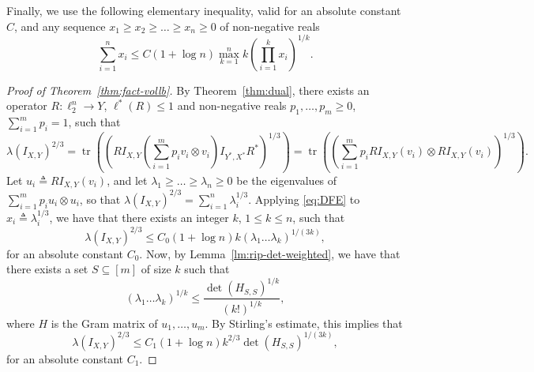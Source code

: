 \documentclass[12pt]{article}
\newcommand{\eqdef}{\triangleq}
\DeclareMathOperator{\tr}{tr}
\begin{document}
Finally, we use the following elementary inequality, valid for an
absolute constant $C$, and any sequence $x_1 \ge x_2 \ge \ldots \ge
x_n \ge 0$ of non-negative reals
\begin{equation}
  \label{eq:DFE} %
  \sum_{i = 1}^n{x_i} \le C(1+\log n) 
  \max_{k = 1}^n k \left(\prod_{i = 1}^k{x_i}\right)^{1/k}.
\end{equation}

\begin{proof}[Proof of Theorem~\ref{thm:fact-vollb}]
  By Theorem~\ref{thm:dual}, there exists an operator $R: \ell_2^n \to
  Y$, $\ell^*(R) \le 1$ and non-negative reals $p_1, \ldots, p_m \ge
  0$, $\sum_{i = 1}^m{p_i} = 1$, such that 
  \[
  \lambda(I_{X,Y})^{2/3} 
  = \tr((RI_{X,Y}(\sum_{i = 1}^m{p_i v_i  \otimes  v_i})I_{Y^*,X^*}R^*)^{1/3})
  = \tr((\sum_{i = 1}^m{p_i RI_{X,Y}(v_i)  \otimes  RI_{X,Y}(v_i)})^{1/3}).
  \]
  Let $u_i \eqdef RI_{X,Y}(v_i)$, and let $\lambda_1 \ge \ldots \ge
  \lambda_n \ge 0$ be the eigenvalues of $\sum_{i = 1}^m{p_i u_i
    \otimes u_i}$, so that $\lambda(I_{X,Y})^{2/3} = \sum_{i =
    1}^n{\lambda_i^{1/3}}$. Applying \eqref{eq:DFE} to $x_i \eqdef
  \lambda_i^{1/3}$, we have that there exists an integer $k$, $1 \le k
  \le n$, such that
  \[
  \lambda(I_{X,Y})^{2/3} \le C_0 (1+\log n) k (\lambda_1 \ldots \lambda_k)^{1/(3k)},
  \]
  for an absolute constant $C_0$. Now, by
  Lemma~\ref{lm:rip-det-weighted}, we have that there exists a set $S
  \subseteq [m]$ of size $k$ such that
  \[
  (\lambda_1 \ldots \lambda_k)^{1/k} \le
  \frac{\det(H_{S,S})^{1/k}}{(k!)^{1/k}},
  \]
  where $H$ is the Gram matrix of $u_1, \ldots, u_m$. By Stirling's
  estimate, this implies that 
  \begin{equation}\label{eq:fact-det}
  \lambda(I_{X,Y})^{2/3} \le C_1 (1+\log n) k^{2/3} \det(H_{S,S})^{1/(3k)},
  \end{equation}
  for an absolute constant $C_1$. 


\end{proof}
\end{document}
